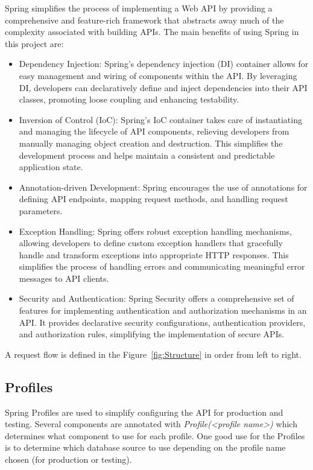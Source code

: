 Spring simplifies the process of implementing a Web API by providing a comprehensive and feature-rich framework that abstracts away much of the complexity associated with building APIs. The main benefits of using Spring in this project are:
\begin{itemize}
    \item Dependency Injection: Spring's dependency injection (DI) container allows for easy management and wiring of components within the API. By leveraging DI, developers can declaratively define and inject dependencies into their API classes, promoting loose coupling and enhancing testability.

    \item Inversion of Control (IoC): Spring's IoC container takes care of instantiating and managing the lifecycle of API components, relieving developers from manually managing object creation and destruction. This simplifies the development process and helps maintain a consistent and predictable application state.

    \item Annotation-driven Development: Spring encourages the use of annotations for defining API endpoints, mapping request methods, and handling request parameters.

    \item Exception Handling: Spring offers robust exception handling mechanisms, allowing developers to define custom exception handlers that gracefully handle and transform exceptions into appropriate HTTP responses. This simplifies the process of handling errors and communicating meaningful error messages to API clients.

    \item Security and Authentication: Spring Security offers a comprehensive set of features for implementing authentication and authorization mechanisms in an API. It provides declarative security configurations, authentication providers, and authorization rules, simplifying the implementation of secure APIs.

\end{itemize}

A request flow is defined in the Figure~\ref{fig:Structure} in order from left to right.

\subsection{Profiles}
Spring Profiles are used to simplify configuring the API for production and testing. Several components are annotated with 
\textit{Profile(<profile name>)} which determines what component to use for each profile.
One good use for the Profiles is to determine which database source to use depending on the profile name chosen (for production or testing).


